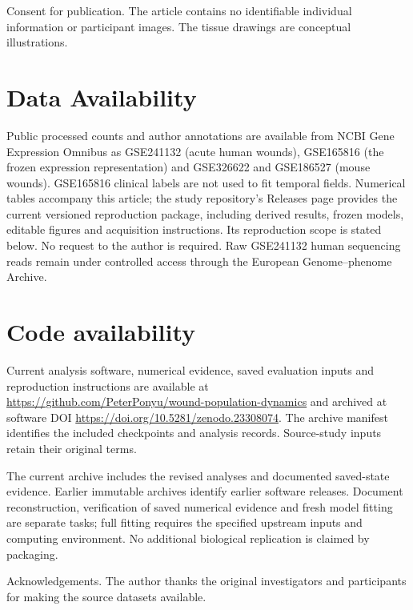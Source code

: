 \documentclass[10pt,a4paper]{article}
\begin{document}
Consent for publication. The article contains no identifiable individual information or participant images. The tissue drawings are conceptual illustrations.

\section*{Data Availability}
Public processed counts and author annotations are available from NCBI Gene Expression Omnibus as GSE241132 (acute human wounds), GSE165816 (the frozen expression representation) and GSE326622 and GSE186527 (mouse wounds). GSE165816 clinical labels are not used to fit temporal fields. Numerical tables accompany this article; the study repository's Releases page provides the current versioned reproduction package, including derived results, frozen models, editable figures and acquisition instructions. Its reproduction scope is stated below. No request to the author is required. Raw GSE241132 human sequencing reads remain under controlled access through the European Genome--phenome Archive.

\section*{Code availability}
Current analysis software, numerical evidence, saved evaluation inputs and reproduction instructions are available at \url{https://github.com/PeterPonyu/wound-population-dynamics} and archived at software DOI \url{https://doi.org/10.5281/zenodo.23308074}. The archive manifest identifies the included checkpoints and analysis records. Source-study inputs retain their original terms.

The current archive includes the revised analyses and documented saved-state evidence. Earlier immutable archives identify earlier software releases. Document reconstruction, verification of saved numerical evidence and fresh model fitting are separate tasks; full fitting requires the specified upstream inputs and computing environment. No additional biological replication is claimed by packaging.

Acknowledgements. The author thanks the original investigators and participants for making the source datasets available.
\FloatBarrier


\end{document}
